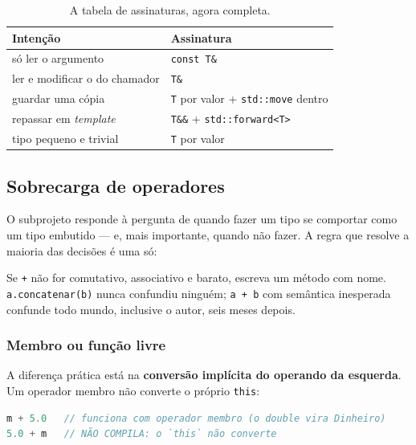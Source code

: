 \begin{table}[htbp]
\centering
\caption{A tabela de assinaturas, agora completa.}
\label{tab:assinaturas}
\footnotesize
\begin{tabular}{@{}ll@{}}
\toprule
\textbf{Intenção} & \textbf{Assinatura} \\
\midrule
só ler o argumento                & \texttt{const T\&} \\
ler e modificar o do chamador     & \texttt{T\&} \\
guardar uma cópia                 & \texttt{T} por valor + \texttt{std::move} dentro \\
repassar em \emph{template}       & \texttt{T\&\&} + \texttt{std::forward<T>} \\
tipo pequeno e trivial            & \texttt{T} por valor \\
\bottomrule
\end{tabular}
\end{table}

\subsection{Sobrecarga de operadores}
\label{sec:operators}

O subprojeto  responde à pergunta de quando fazer um tipo se
comportar como um tipo embutido --- e, mais importante, quando não fazer. A
regra que resolve a maioria das decisões é uma só:

\begin{regra}
Se \texttt{+} não for comutativo, associativo e barato, escreva um método com
nome. \texttt{a.concatenar(b)} nunca confundiu ninguém; \texttt{a + b} com
semântica inesperada confunde todo mundo, inclusive o autor, seis meses depois.
\end{regra}

\subsubsection{Membro ou função livre}

A diferença prática está na \textbf{conversão implícita do operando da
esquerda}. Um operador membro não converte o próprio \texttt{this}:

\begin{lstlisting}[style=bt, language=C++,
    caption={A assimetria que decide a forma.}]
m + 5.0   // funciona com operador membro (o double vira Dinheiro)
5.0 + m   // NÃO COMPILA: o `this` não converte
\end{lstlisting}

